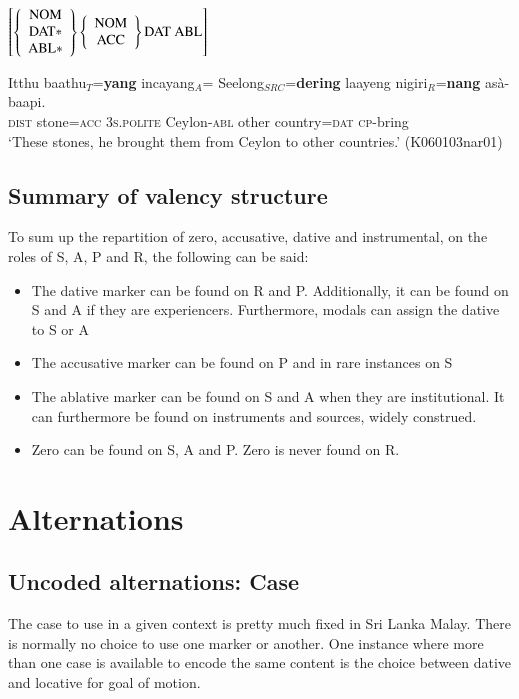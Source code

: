 \documentclass[a4paper,10pt]{article}
\begin{document}
\ea \label{ex:fourplaceschema}
$
\left[
\left\{\begin{array}{c}\rm NOM \\ \rm DAT*\\ \rm ABL* \end{array}\right\}
\left\{\begin{array}{c}\rm NOM \\ \rm ACC  \end{array}\right\}
\rm DAT
~
\rm ABL
\right]
$
\z

\ea\label{ex:args:4}
\gll Itthu    baathu$_{T}$=\textbf{yang}    incayang$_{A}$=\zero{} Seelong$_{SRC}$=\textbf{dering} laayeng nigiri$_{R}$=\textbf{nang} asà-baapi. \\
 \textsc{dist} stone=\textsc{acc} \textsc{3s.polite} Ceylon-\textsc{abl} other country=\textsc{dat} \textsc{cp}-bring\\
`These stones, he brought them from Ceylon to other countries.' (K060103nar01)
\z


\subsection{Summary of valency structure}\label{sec:argstr:Summaryofargumentrstructure}
To sum up the repartition of zero, accusative, dative and instrumental, on the roles of S, A, P and R, the following can be said:

\begin{itemize}
 \item The dative marker can be found on R and P. Additionally, it can be found on S and A if they are experiencers. Furthermore, modals can assign the dative to S or A
 \item The accusative marker can be found on P and in rare instances on S
 \item The ablative marker can be found on S and A when they are institutional. It can furthermore be found on instruments and sources, widely construed.
 \item Zero can be found on S, A and P. Zero is never found on R.
\end{itemize}

\section{Alternations}
\subsection{Uncoded alternations: Case}\label{sec:casealternations}
The case to use in a given context is pretty much fixed in Sri Lanka Malay. There is normally no choice to use one marker or another. One instance where more than one case is available to encode the same content is the choice between dative and locative for goal of motion.
\end{document}
